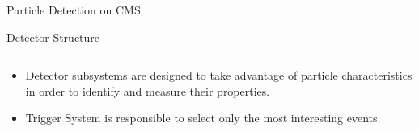 \documentclass[8pt]{beamer}
\begin{document}
\begin{frame}{Particle Detection on CMS}
\begin{block}{Detector Structure}
\begin{columns}
    \end{columns}

  \end{block}

  \begin{itemize}
    \item Detector subsystems are designed to take advantage of particle characteristics in order to identify and measure
          their properties.
    \item Trigger System is responsible to select only the most interesting events.
  \end{itemize} 

\end{frame}
\end{document}
